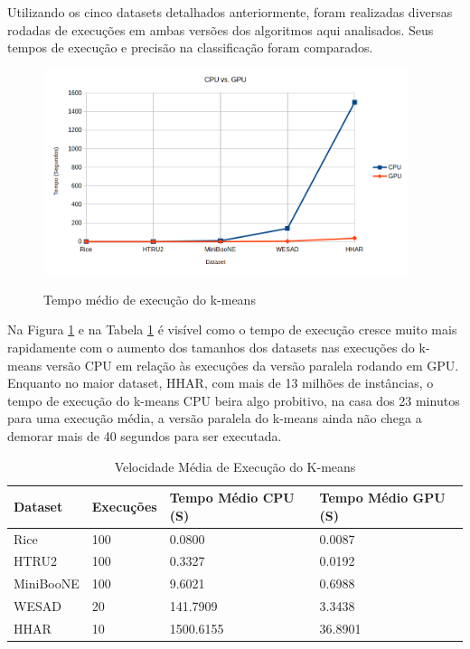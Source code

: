 \documentclass[12pt,
openright, 
oneside, %
a4paper,    %
brazil]{facom-ufu-abntex2}
\begin{document}
Utilizando os cinco datasets detalhados anteriormente, foram realizadas diversas rodadas de execuções em ambas versões dos algoritmos aqui analisados. Seus tempos de execução e precisão na classificação foram comparados.

\begin{figure}[h]
  \caption{Tempo médio de execução do k-means}
  \centering
  \includegraphics[width=0.95\textwidth]{kMeansAvgTime.png}
  \label{fig:kMeansAvgTime}
\end{figure}

Na Figura \ref{fig:kMeansAvgTime} e na Tabela \ref{tab:avgTimeResults} é visível como o tempo de execução cresce muito mais rapidamente com o aumento dos tamanhos dos datasets nas execuções do k-means versão CPU em relação às execuções da versão paralela rodando em GPU. Enquanto no maior dataset, HHAR, com mais de 13 milhões de instâncias, o tempo de execução do k-means CPU beira algo probitivo, na casa dos 23 minutos para uma execução média, a versão paralela do k-means ainda não chega a demorar mais de 40 segundos para ser executada.

\begin{table}[h]
  \centering
  \caption{Velocidade Média de Execução do K-means}
  \label{tab:avgTimeResults}
  \begin{tabular}{|l|l|l|l|}
  \hline
  \rowcolor[HTML]{9B9B9B} 
  \textbf{Dataset} & \textbf{Execuções} & \textbf{Tempo Médio CPU (S)} & \textbf{Tempo Médio GPU (S)} \\ \hline
  Rice             & 100                & 0.0800                       & 0.0087                       \\ \hline
  HTRU2            & 100                & 0.3327                       & 0.0192                       \\ \hline
  MiniBooNE        & 100                & 9.6021                       & 0.6988                       \\ \hline
  WESAD            & 20                 & 141.7909                     & 3.3438                       \\ \hline
  HHAR             & 10                 & 1500.6155                    & 36.8901                      \\ \hline
  \end{tabular}
\end{table}
\end{document}

